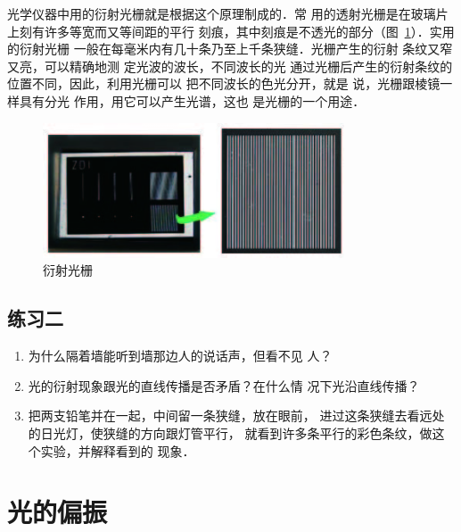 光学仪器中用的衍射光栅就是根据这个原理制成的．常
用的透射光栅是在玻璃片上刻有许多等宽而又等间距的平行
刻痕，其中刻痕是不透光的部分（图~\ref{fig_C_6-10}）．实用的衍射光栅
一般在每毫米内有几十条乃至上千条狭缝．光栅产生的衍射
条纹又窄又亮，可以精确地测
定光波的波长，不同波长的光
通过光栅后产生的衍射条纹的
位置不同，因此，利用光栅可以
把不同波长的色光分开，就是
说，光栅跟棱镜一样具有分光
作用，用它可以产生光谱，这也
是光栅的一个用途．
\begin{figure}[htbp]
    \centering
    \includegraphics[height=4cm]{fig/C/6-10.jpg}
    \caption{衍射光栅}\label{fig_C_6-10}
\end{figure}

\subsection*{练习二}
\begin{enumerate}
\item 为什么隔着墙能听到墙那边人的说话声，但看不见
人？
\item 光的衍射现象跟光的直线传播是否矛盾？在什么情
况下光沿直线传播？
\item 把两支铅笔并在一起，中间留一条狭缝，放在眼前，
进过这条狭缝去看远处的日光灯，使狭缝的方向跟灯管平行，
就看到许多条平行的彩色条纹，做这个实验，并解释看到的
现象．
\end{enumerate}

\section{光的偏振}

